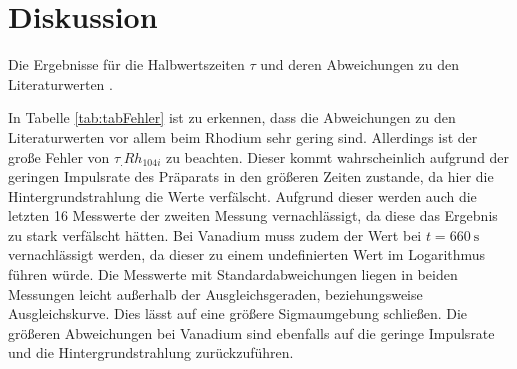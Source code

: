 
\section{Diskussion}
\label{sec:Diskussion}

\begin{table}
	\centering
	\caption{Die Ergebnisse für die Halbwertszeiten $\tau$ und deren Abweichungen zu den Literaturwerten\cite{Halbwertszeiten} .}
	
	\label{tab:tabFehler}
\end{table}

\noindent In Tabelle \ref{tab:tabFehler} ist zu erkennen, dass die Abweichungen zu den Literaturwerten vor allem beim Rhodium sehr gering sind. Allerdings ist der große Fehler von $\tau_.{Rh_{104i}}$ zu beachten. Dieser kommt wahrscheinlich aufgrund der geringen Impulsrate des Präparats in den größeren Zeiten zustande, da hier die Hintergrundstrahlung die Werte verfälscht. Aufgrund dieser werden auch die letzten 16 Messwerte der zweiten Messung vernachlässigt, da diese das Ergebnis zu stark verfälscht hätten. Bei Vanadium muss zudem der Wert bei $t=\SI{660}{\second}$ vernachlässigt werden, da dieser zu einem undefinierten Wert im Logarithmus führen würde. Die Messwerte mit Standardabweichungen liegen in beiden Messungen leicht außerhalb der Ausgleichsgeraden, beziehungsweise Ausgleichskurve. Dies lässt auf eine größere Sigmaumgebung schließen. Die größeren Abweichungen bei Vanadium sind ebenfalls auf die geringe Impulsrate und die Hintergrundstrahlung zurückzuführen.       
